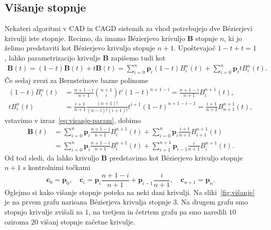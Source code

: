 \documentclass[isrm2, tisk]{fmfdelo}
\newcommand{\p}{\mathbf{p}}
\newcommand{\B}{\mathbf{B}}
\begin{document}
    \subsection{Višanje stopnje}
    Nekateri algoritmi v CAD in CAGD sistemih za vhod potrebujejo dve Bézierjevi krivulji iste stopnje.
    Recimo, da imamo Bézierjevo krivuljo $\B$ stopnje $n$, ki jo želimo predstaviti kot Bézierjevo krivuljo stopnje $n+1$.
    Upoštevajoč $1-t+t=1$, lahko parametrizacijo krivulje $\B$ zapišemo tudi kot
    \begin{align}
        \B(t) = (1-t)\B(t)+t\B(t) = \sum_{i=0}^{n}\mathbf{p}_{i}(1-t)B_i^n(t) +\sum_{i=0}^{n}\mathbf{p}_{i}tB_i^n(t). \label{eq:visanje-param}
    \end{align}
    Če sedaj zvezi za Bernsteinove bazne polinome
    \begin{align*}
    (1-t)
        B_i^n(t) &=  \frac{n+1-i}{n+1} \binom{n+1}{i}t^i(1-t)^{n+1-i} =\frac{n+1-i}{n+1}B_{i}^{n+1}(t), \\
        tB_i^n(t) &=  \frac{i+1}{n+1}\frac{(n+1)!}{(n-i)!(i+1)!}t^{i+1}(1-t)^{n+1-i-1}= \frac{i+1}{n+1}B_{n+1}^{n+1}(t),
    \end{align*}
    vstavimo v izraz~\eqref{eq:visanje-param}, dobimo
    \begin{align*}
        \B(t) &= \sum_{i=0}^{n}\mathbf{p}_{i}\frac{n+1-i}{n+1}B_{i}^{n+1}(t) +\sum_{i=0}^{n}\mathbf{p}_{i}\frac{i+1}{n+1}B_{i+1}^{n+1}(t)\\
        &= \sum_{i=0}^{n}\mathbf{p}_{i}\frac{n+1-i}{n+1}B_{i}^{n+1}(t) +\sum_{i=1}^{n+1}\mathbf{p}_{i-1}\frac{i}{n+1}B_{i}^{n+1}(t).
    \end{align*}
    Od tod sledi, da lahko krivuljo $\B$ predstavimo kot Bézierjevo krivuljo stopnje $n+1$ s kontrolnimi točkami \[\mathbf{c}_0=\p_0, \quad \mathbf{c}_i=\mathbf{p}_{i}\frac{n+1-i}{n+1} + \mathbf{p}_{i-1}\frac{i}{n+1},\quad \mathbf{c}_{n+1}=\p_n. \]
    Oglejmo si kako višanje stopnje poteka na neki dani krivulji.
    Na sliki~\ref{fig:višanje} je na prvem grafu narisana Bézierjeva krivulja stopnje $3$.
    Na drugem grafu smo stopnjo krivulje zvišali za $1$, na tretjem in četrtem grafu pa smo naredili $10$ oziroma $20$ višanj stopnje začetne krivulje.
\end{document}
